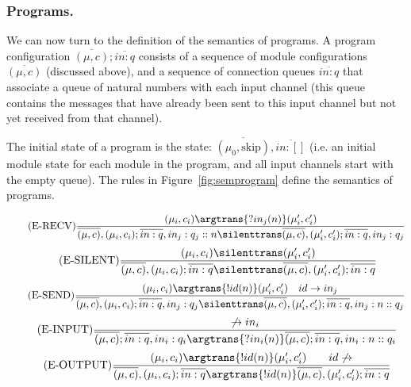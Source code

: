 \subsubsection{Programs.}
%
We can now turn to the definition of the semantics of programs.
A program configuration $\overline{(\mu,c)} ; \overline{in : q}$ consists of a sequence of module configurations $\overline{(\mu,c)}$ (discussed above),
and a sequence of connection queues $\overline{in : q}$ that associate a queue of natural numbers with each input channel (this queue
contains the messages that have already been sent to this input channel but not yet received from that channel).

The initial state of a program is the state: $\overline{(\mu_0,\mathrm{skip})}, \overline{in : []}$  (i.e. an initial module state for each module in the program, and
all input channels start with the empty queue).
%
The rules in Figure~\ref{fig:semprogram} define the semantics of programs.

\begin{figure*}[htbp]
	\begin{equation} \tag{E-RECV}
	\frac
		{ (\mu_i, c_i) \argtrans{?in_j(n)}(\mu_i',c_i' ) }
		{\overline{(\mu,c)}, (\mu_i, c_i); \overline{in : q}, in_j: q_j :: n \silenttrans \overline{(\mu,c)},(\mu_i',c_i' ); \overline{ in : q}, in_j:q_j }
	\end{equation}
	\begin{equation} \tag{E-SILENT}
	\frac
		{ (\mu_i, c_i) \silenttrans (\mu_i',c_i' ) }
		{\overline{(\mu,c)}, (\mu_i, c_i); \overline{in : q} \silenttrans \overline{(\mu,c)},(\mu_i',c_i' ); \overline{ in : q} }
	\end{equation}
	\begin{equation} \tag{E-SEND}
	\frac
		{ (\mu_i, c_i) \argtrans{!id(n)}(\mu_i',c_i' ) \quad id \to in_j }
		{\overline{(\mu,c)}, (\mu_i, c_i); \overline{in : q}, in_j: q_j \silenttrans \overline{(\mu,c)},(\mu_i',c_i' ); \overline{ in : q}, in_j: n::q_j }
	\end{equation}
	\begin{equation} \tag{E-INPUT}
	\frac
		{  \not\to in_i }
		{\overline{(\mu,c)}; \overline{in : q}, in_i: q_i \argtrans{?in_i(n)} \overline{(\mu,c)}; \overline{ in : q}, in_i: n::q_i }
	\end{equation}
	\begin{equation} \tag{E-OUTPUT}
	\frac
		{ (\mu_i, c_i) \argtrans{!id(n)}(\mu_i',c_i' ) \qquad id \not\to}
		{\overline{(\mu,c)}, (\mu_i, c_i); \overline{in : q} \argtrans{!id(n)} \overline{(\mu,c)},(\mu_i',c_i' ) ; \overline{ in : q} }
	\end{equation}
	\caption{Small-step semantics for programs.}
	\label{fig:semprogram}
\end{figure*}

